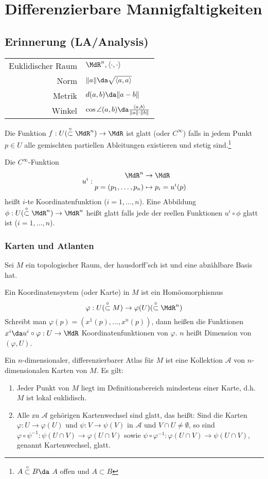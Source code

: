 \documentclass[a4paper,twoside,DIV15,BCOR12mm]{scrbook}
\newcommand{\otm}{\stackrel{\circ}{\subset}} %
\newcommand{\At}{\mathcal A}
\begin{document}
\section{Differenzierbare Mannigfaltigkeiten}

\subsection*{Erinnerung (LA/Analysis)}
\begin{tabular}{rl}
Euklidischer Raum & $\MdR^n, \langle\cdot,\cdot\rangle$ \\
Norm & $ \|a\| \da  \sqrt{\langle a, a\rangle} $ \\
Metrik & $d(a,b) \da  \| a-b\| $ \\
Winkel & $\cos \angle(a,b) \da  \frac{\langle a, b\rangle}{\|a\|\cdot\|b\|} $ 
\end{tabular}

Die Funktion $f:U (\otm \MdR^n) \to \MdR$ ist glatt (oder $C^\infty$) falls in jedem Punkt $p\in U$ alle gemischten partiellen Ableitungen existieren und stetig sind.\footnote{$A\otm B \da  $ $A$ offen und $A\subset B$}

Die $C^\infty$-Funktion
\[ u^i:
\begin{aligned}
\MdR^n &\to \MdR \\
p = (p_1,\ldots,p_n) &\mapsto p_i =u^i(p)
\end{aligned}
\]
heißt $i$-te Koordinatenfunktion ($i=1,\ldots,n$). Eine Abbildung $\phi: U(\otm \MdR^n)\to \MdR^n$ heißt glatt falls jede der reellen Funktionen $u^i\circ\phi$ glatt ist ($i=1,\ldots,n$).

\subsubsection*{Karten und Atlanten}
Sei $M$ ein topologischer Raum, der hausdorff’sch ist und eine abzählbare Basis hat.

Ein Koordinatensystem (oder Karte) in $M$ ist ein Homöomorphismus
\[\varphi: U(\otm M) \to \varphi(U) (\otm\MdR^n) \]
Schreibt man $\varphi(p) = (x^1(p),\ldots,x^n(p))$, dann heißen die Funktionen $x^i \da  u^i\circ \varphi : U \to \MdR$ Koordinatenfunktionen von $\varphi$. $n$ heißt Dimension von $(\varphi,U)$.

Ein $n$-dimensionaler, differenzierbarer Atlas für $M$ ist eine Kollektion $\At$ von $n$-dimensionalen Karten von $M$. Es gilt:
\begin{enumerate}[($\At$1)]
\item Jeder Punkt von $M$ liegt im Definitionsbereich mindestens einer Karte, d.h. $M$ ist lokal euklidisch.
\item Alle zu $\At$ gehörigen Kartenwechsel sind glatt, das heißt: Sind die Karten $\varphi: U\to \varphi(U)$ und $\psi:V\to\psi(V)$ in $\At$ und $V\cap U \ne \emptyset$, so sind $\varphi \circ \psi^{-1}: \psi(U\cap V) \to \varphi(U\cap V)$ sowie $\psi \circ \varphi^{-1}: \varphi(U\cap V) \to \psi(U \cap V)$, genannt Kartenwechsel, glatt.
\end{enumerate}
\end{document}

